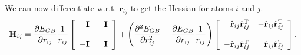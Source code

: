 \documentclass[12pt]{article}
\begin{document}
We can now differentiate w.r.t. $\mathbf{r}_{ij}$ to get the Hessian for atoms $i$ and $j$.
\begin{equation}
\mathbf{H}_{ij}=
\frac{\partial E_{GB}}{\partial r_{ij}}\frac{1}{r_{ij}}
\left[
\begin{array}{r r}
\mathbf{I} & -\mathbf{I}\\
\\
-\mathbf{I} & \mathbf{I}
\end{array}\right]
+
\left(
\frac{\partial^2 E_{GB}}{\partial r_{ij}^2}-\frac{\partial E_{GB}}{\partial r_{ij}}\frac{1}{r_{ij}}
\right)
\left[
\begin{array}{r r}
\hat{\mathbf{r}}_{ij}\hat{\mathbf{r}}_{ij}^{\mathrm{T}} & -\hat{\mathbf{r}}_{ij}\hat{\mathbf{r}}_{ij}^{\mathrm{T}}\\
\\
-\hat{\mathbf{r}}_{ij}\hat{\mathbf{r}}_{ij}^{\mathrm{T}} & \hat{\mathbf{r}}_{ij}\hat{\mathbf{r}}_{ij}^{\mathrm{T}}
\end{array}\right].
\end{equation}
\end{document}
